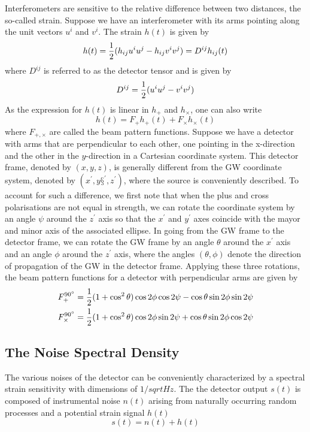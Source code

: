 \documentclass[binding=0.6cm, LaM]{sapthesis}
\begin{document}
Interferometers are sensitive to the relative difference between two distances, the so-called strain.
 Suppose we have an interferometer with its arms pointing along the unit vectors $u^i$ and $v^i$. The strain $h(t)$ is given by
\begin{equation}
h(t) = {1 \over 2} (h_{ij}u^iu^j - h_{ij}v^iv^j) = D^{ij}h_{ij}(t)
\end{equation}
where $D^{ij}$ is referred to as the detector tensor and is given by
\begin{equation}
D^{ij} = {1\over 2} (u^iu^j -v^iv^j)
\end{equation}
As the expression for $h(t)$ is linear in $h_{+}$ and $h_{\times}$, one can also write
\begin{equation}
h(t) = F_{+}h_{+} (t) + F_{\times}h_{\times}(t)
\end{equation}
where $F_{+,\times}$ are called the beam pattern functions. Suppose we have a detector with arms that are perpendicular to each other, one pointing in the x-direction and the other
in the $y$-direction in a Cartesian coordinate system. This detector frame, denoted by $(x,y,z)$, is generally different from the GW coordinate system, denoted by $(x^\prime,y§^\prime,z^\prime)$, where the source
is conveniently described. To account for such a difference, we first note that when the plus and cross polarisations are not equal in strength, we can rotate the coordinate system by
an angle $\psi$ around the $z^\prime$ axis so that the $x^\prime$ and $y^\prime$ axes coincide with the mayor and minor axis of the associated ellipse.
 In going from the GW frame to the detector frame, we can rotate the GW frame by an angle $\theta$ around the $x^\prime$ axis and an angle $\phi$ around the $z^\prime$ axis,
where the angles $(\theta, \phi)$ denote the direction of propagation of the GW in the detector frame.
Applying these three rotations, the beam pattern functions for a detector with perpendicular arms are given by 
\begin{align}
F_{+}^{\ang{90}}& = {1 \over 2} (1 + \cos^2 \theta)\cos 2\phi \cos 2 \psi - \cos \theta \sin2\phi \sin2\psi \\
F_{\times}^{\ang{90}}& = {1 \over 2} (1 + \cos^2 \theta)\cos 2\phi \sin 2 \psi + \cos \theta \sin2\phi \cos2\psi
\end{align}

\subsection{The Noise Spectral Density}
The various noises of the detector can be conveniently characterized by a spectral strain
sensitivity with dimensions of $1/sqrt{Hz}$. 
The the detector output $s(t)$ is composed of instrumental noise $n(t)$ arising from naturally occurring random processes and a potential strain signal $h(t)$
\begin{equation}
s(t) = n(t) + h(t)
\end{equation}
\end{document}
